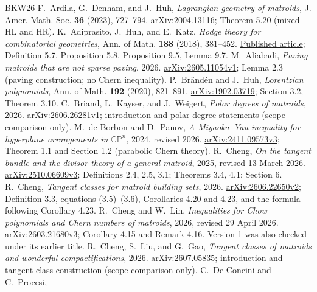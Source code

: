 \documentclass[12pt]{amsart}
\theoremstyle{definition}
\theoremstyle{remark}
\numberwithin{equation}{section}
\begin{document}
\begin{thebibliography}{BKW26}
 F.~Ardila, G.~Denham, and J.~Huh,
\emph{Lagrangian geometry of matroids}, J. Amer. Math. Soc. \textbf{36} (2023), 727--794.
\href{https://arxiv.org/abs/2004.13116}{arXiv:2004.13116}; Theorem 5.20 (mixed HL and HR).
 K.~Adiprasito, J.~Huh, and E.~Katz,
\emph{Hodge theory for combinatorial geometries}, Ann. of Math. \textbf{188} (2018), 381--452.
\href{https://annals.math.princeton.edu/2018/188-2/p01}{Published article};
Definition 5.7, Proposition 5.8, Proposition 9.5, Lemma 9.7.
 M.~Aliabadi,
\emph{Paving matroids that are not sparse paving}, 2026.
\href{https://arxiv.org/abs/2605.11054v1}{arXiv:2605.11054v1}; Lemma 2.3 (paving construction; no Chern inequality).
 P.~Br\"and\'en and J.~Huh,
\emph{Lorentzian polynomials}, Ann. of Math. \textbf{192} (2020), 821--891.
\href{https://arxiv.org/abs/1902.03719}{arXiv:1902.03719}; Section 3.2, Theorem 3.10.
 C.~Briand, L.~Kayser, and J.~Weigert,
\emph{Polar degrees of matroids}, 2026.
\href{https://arxiv.org/abs/2606.26281v1}{arXiv:2606.26281v1}; introduction and polar-degree statements (scope comparison only).
 M.~de Borbon and D.~Panov,
\emph{A Miyaoka--Yau inequality for hyperplane arrangements in $\mathbb{CP}^n$}, 2024, revised 2026.
\href{https://arxiv.org/abs/2411.09573v3}{arXiv:2411.09573v3}; Theorem 1.1 and Section 1.2 (parabolic Chern theory).
 R.~Cheng,
\emph{On the tangent bundle and the divisor theory of a general matroid}, 2025, revised 13 March 2026.
\href{https://arxiv.org/abs/2510.06609v3}{arXiv:2510.06609v3};
Definitions 2.4, 2.5, 3.1; Theorems 3.4, 4.1; Section 6.
 R.~Cheng,
\emph{Tangent classes for matroid building sets}, 2026.
\href{https://arxiv.org/abs/2606.22650v2}{arXiv:2606.22650v2};
Definition 3.3, equations (3.5)--(3.6), Corollaries 4.20 and 4.23, and the formula following Corollary 4.23.
 R.~Cheng and W.~Lin,
\emph{Inequalities for Chow polynomials and Chern numbers of matroids}, 2026, revised 29 April 2026.
\href{https://arxiv.org/abs/2603.21680v3}{arXiv:2603.21680v3};
Corollary 4.15 and Remark 4.16. Version 1 was also checked under its earlier title.
 R.~Cheng, S.~Liu, and G.~Gao,
\emph{Tangent classes of matroids and wonderful compactifications}, 2026.
\href{https://arxiv.org/abs/2607.05835}{arXiv:2607.05835}; introduction and tangent-class construction (scope comparison only).
 C.~De Concini and C.~Procesi,

\end{thebibliography}
\end{document}
